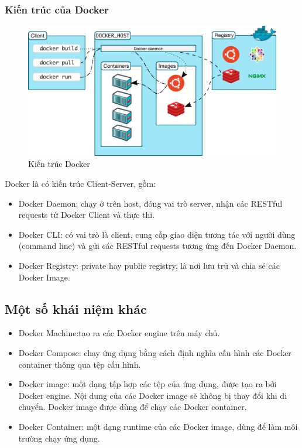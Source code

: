 \documentclass[11pt,a4paper]{article}
\begin{document}
\subsubsection{Kiến trúc của Docker}
\begin{figure}
    \centering
    \includegraphics[width=16cm]{fig/docker_architecture.png}
    \caption{Kiến trúc Docker}
    \label{fig:docker_architecture}
\end{figure}
Docker là có kiến trúc Client-Server, gồm:
\begin{itemize}
    \item Docker Daemon: chạy ở trên host, đóng vai trò server, nhận các RESTful requests từ Docker Client và thực thi.
    \item Docker CLI: có vai trò là client, cung cấp giao diện tương tác với người dùng (command line) và gửi các RESTful requests tương ứng đến Docker Daemon.
    \item Docker Registry: private hay public registry, là nơi lưu trữ và chia sẻ các Docker Image.
\end{itemize}
\subsection{Một số khái niệm khác}
\begin{itemize}
    \item Docker Machine:tạo ra các Docker engine trên máy chủ.
    \item Docker Compose: chạy ứng dụng bằng cách định nghĩa cấu hình các Docker container thông qua tệp cấu hình.
    \item Docker image: một dạng tập hợp các tệp của ứng dụng, được tạo ra bởi Docker engine. Nội dung của các Docker image sẽ không bị thay đổi khi di chuyển. Docker image được dùng để chạy các Docker container.
    \item Docker Container: một dạng runtime của các Docker image, dùng để làm môi trường chạy ứng dụng.
\end{itemize}
\newpage
\end{document}

